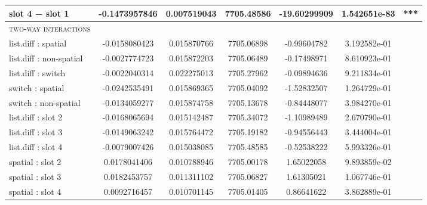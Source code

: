 \begin{center}
\begin{longtable}{l S[table-format=>1.3] S[table-format=1.3] S[table-format=4.1,round-precision=1] S[table-format=>2.2,round-precision=2] S[table-format=>1.3] c }
slot 4 − slot 1                            & -0.1473957846  &           0.007519043  &            7705.48586  &           -19.60299909  &           1.542651e-83  &    ***  \\ \midrule
\scshape{two-way interactions}             &                &                        &                        &                         &                         &         \\
list.diff : spatial                        & -0.0158080423  &           0.015870766  &            7705.06898  &            -0.99604782  &           3.192582e-01  &         \\
list.diff : non-spatial                    & -0.0027774723  &           0.015872203  &            7705.06489  &            -0.17498971  &           8.610923e-01  &         \\
list.diff : switch                         & -0.0022040314  &           0.022275013  &            7705.27962  &            -0.09894636  &           9.211834e-01  &         \\
switch : spatial                           & -0.0242535491  &           0.015869365  &            7705.04092  &            -1.52832507  &           1.264729e-01  &         \\
switch : non-spatial                       & -0.0134059277  &           0.015874758  &            7705.13678  &            -0.84448077  &           3.984270e-01  &         \\
list.diff : slot 2                         & -0.0168065694  &           0.015142487  &            7705.34072  &            -1.10989489  &           2.670790e-01  &         \\
list.diff : slot 3                         & -0.0149063242  &           0.015764472  &            7705.19182  &            -0.94556443  &           3.444004e-01  &         \\
list.diff : slot 4                         & -0.0079007426  &           0.015038085  &            7705.48585  &            -0.52538222  &           5.993326e-01  &         \\
spatial : slot 2                           &  0.0178041406  &           0.010788946  &            7705.00178  &             1.65022058  &           9.893859e-02  &         \\
spatial : slot 3                           &  0.0182453757  &           0.011311102  &            7705.06827  &             1.61305021  &           1.067746e-01  &         \\
spatial : slot 4                           &  0.0092716457  &           0.010701145  &            7705.01405  &             0.86641622  &           3.862889e-01  &         \\

\end{longtable}
\end{center}
